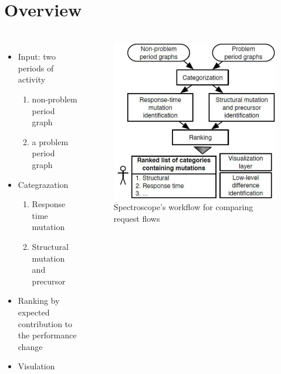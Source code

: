 \documentclass[11pt]{beamer}
\begin{document}
\section{Overview}
\begin{frame}
\frametitle{\secname}
\begin{columns}
\begin{itemize}
  \item Input: two periods of activity
  \begin{enumerate}
    \item non-problem period graph
    \item a problem period graph
  \end{enumerate}
  \item Categrazation
  \begin{enumerate}
    \item Response time mutation
    \item Structural mutation and precursor
  \end{enumerate}
  \item Ranking by expected contribution to the performance change
  \item Visulation
\end{itemize}
\begin{figure}[htbp]
\centering
\includegraphics[width=\textwidth]{res/workflow.pdf}
\caption{Spectroscope's workflow for comparing request flows}
\label{fig:workflow}
\end{figure}
\end{columns}
\end{frame}
\end{document}

